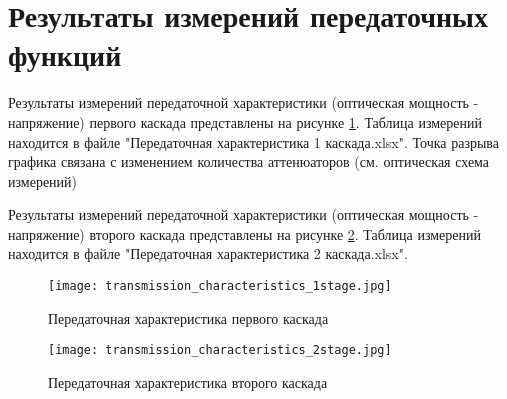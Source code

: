 \section*{Результаты измерений передаточных функций}

Результаты измерений передаточной характеристики 
(оптическая мощность - напряжение) первого 
каскада представлены на рисунке \ref{fig:transmission_characteristics_1stage}. 
Таблица измерений находится в файле "Передаточная характеристика 1 каскада.xlsx".
Точка разрыва графика связана с изменением количества 
аттенюаторов (см. оптическая схема измерений)

Результаты измерений передаточной характеристики 
(оптическая мощность - напряжение) второго 
каскада представлены на рисунке \ref{fig:transmission_characteristics_2stage}. 
Таблица измерений находится в файле "Передаточная характеристика 2 каскада.xlsx".

\begin{figure}[h]
    \centering
    \texttt{[image: transmission\_characteristics\_1stage.jpg]}
    \caption{Передаточная характеристика первого каскада}
    \label{fig:transmission_characteristics_1stage}
\end{figure}

\begin{figure}[h]
    \centering
    \texttt{[image: transmission\_characteristics\_2stage.jpg]}
    \caption{Передаточная характеристика второго каскада}
    \label{fig:transmission_characteristics_2stage}
\end{figure}


